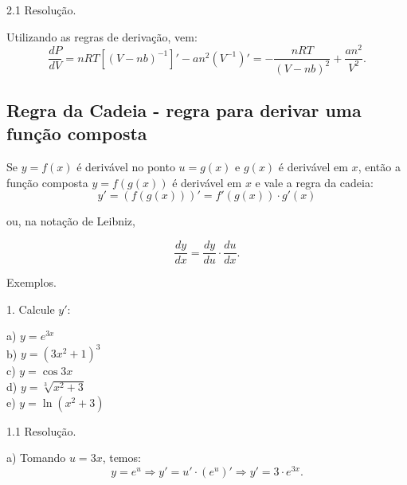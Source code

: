 \documentclass{article}
\begin{document}
{\begin{newpage}
\begin{flushleft}
\end{flushleft}
\vspace{0.3cm}
\begin{flushleft}
2.1 Resolução.
\end{flushleft}
\par Utilizando as regras de derivação, vem:
\begin{equation*} \displaystyle{\frac{dP}{dV}} = nRT[(V-nb)^{-1}]' - an^{2}(V^{-1})' = -\displaystyle{\frac{nRT}{(V-nb)^2}} + \displaystyle{\frac{an^2}{V^2}} .\end{equation*}
\par
\vspace{0.3cm}
\subsection{Regra da Cadeia - regra para derivar uma função composta}
\par
\hspace{12pt}Se $y=f(x)$ é derivável no ponto $u=g(x)$ e $g(x)$ é derivável em $x$, então a função composta $y=f(g(x))$ é derivável em $x$ e vale a regra da cadeia:
$$y'=(f(g(x)))'=f'(g(x))\cdot g'(x)$$
\begin{center} ou, na notação de Leibniz, \end{center}
$$\displaystyle{\frac{dy}{dx}}=\displaystyle{\frac{dy}{du}}\cdot\displaystyle{\frac{du}{dx}}.$$
\par
\vspace{0.3cm}
\begin{flushleft}
Exemplos.
\par
\vspace{0.3cm}
1. Calcule $y'$:
\end{flushleft}
\par
\begin{multicols}{5}
a) $y=e^{3x}$\\
b) $y=(3x^2 +1)^3$\\
\hspace{15pt}c) $y=\cos{3x}$\\
d) $y=\sqrt[3]{x^2 + 3}$\\
e) $y=\ln{(x^2 + 3)}$
\end{multicols}
\par
\vspace{0.3cm}
\begin{flushleft}
1.1 Resolução.
\end{flushleft}
\par
a) Tomando $u=3x$, temos:
\begin{equation*} y=e^{u}\Rightarrow y'=u'\cdot (e^{u})' \Rightarrow y'=3\cdot e^{3x} .\end{equation*}

\end{newpage}}
\end{document}
